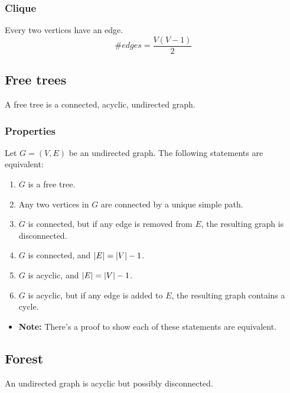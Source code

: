     \subsubsection{Clique}
    \begin{definition}
        Every two vertices have an edge. 
        \begin{equation*}
            \# edges = \frac{V(V-1)}{2}
        \end{equation*}
    \end{definition}

\subsection{Free trees}
    \begin{definition}
        A free tree is a connected, acyclic, undirected graph. 
    \end{definition}

    \subsubsection{Properties}
    \begin{definition}
        Let $G=(V,E)$ be an undirected graph. The following statements are equivalent:
        \begin{enumerate}
            \item $G$ is a free tree. 
            \item Any two vertices in $G$ are connected by a unique simple path. 
            \item $G$ is connected, but if any edge is removed from $E$, the resulting graph is disconnected. 
            \item $G$ is connected, and $\abs{E} = \abs{V} - 1$.
            \item $G$ is acyclic, and $\abs{E} = \abs{V} - 1$.
            \item $G$ is acyclic, but if any edge is added to $E$, the resulting graph contains a cycle.
        \end{enumerate}
        \begin{itemize}
            \item \textbf{Note:} There's a proof to show each of these statements are equivalent.
        \end{itemize}
    \end{definition}

\subsection{Forest}
    \begin{definition}
        An undirected graph is acyclic but possibly disconnected.
    \end{definition}

